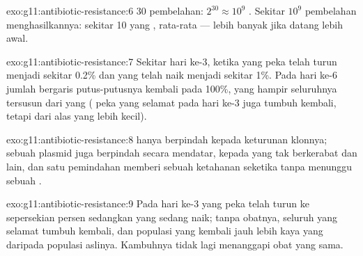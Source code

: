 \begin{solution}{exo:g11:antibiotic-resistance:6}
30 pembelahan: $2^{30} \approx 10^9$ . Sekitar $10^9$ pembelahan
menghasilkannya: sekitar 10  yang , rata-rata --- lebih banyak
jika  datang lebih awal.
\end{solution}

\begin{solution}{exo:g11:antibiotic-resistance:7}
Sekitar hari ke-3, ketika  yang peka telah turun menjadi sekitar
0.2\% dan yang  telah naik menjadi sekitar 1\%. Pada hari ke-6
jumlah bergaris putus-putusnya kembali pada 100\%, yang hampir
seluruhnya tersusun dari  yang  ( peka yang selamat pada
hari ke-3 juga tumbuh kembali, tetapi dari alas yang lebih kecil).
\end{solution}

\begin{solution}{exo:g11:antibiotic-resistance:8}
  hanya berpindah kepada keturunan klonnya; sebuah plasmid
juga berpindah secara mendatar, kepada  yang tak berkerabat dan
 lain, dan satu pemindahan memberi sebuah  ketahanan seketika
tanpa menunggu sebuah .
\end{solution}

\begin{solution}{exo:g11:antibiotic-resistance:9}
Pada hari ke-3  yang peka telah turun ke sepersekian persen
sedangkan  yang  sedang naik; tanpa obatnya, seluruh yang
selamat tumbuh kembali, dan populasi yang kembali jauh lebih kaya 
yang  daripada populasi aslinya. Kambuhnya tidak lagi menanggapi
obat yang sama.
\end{solution}

